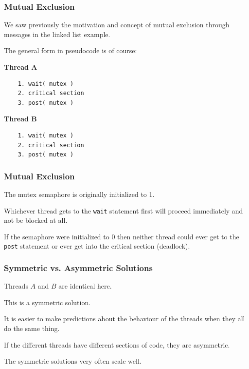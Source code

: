 \begin{frame}[fragile]
	\frametitle{Mutual Exclusion}

	We saw previously the motivation and concept of mutual exclusion through messages in the linked list example.

	The general form in pseudocode is of course:

	\begin{multicols}{2}
		\textbf{Thread A}
		\begin{verbatim}
	1. wait( mutex )
	2. critical section
	3. post( mutex )
  \end{verbatim}
		\columnbreak
		\textbf{Thread B}
		\begin{verbatim}
	1. wait( mutex )
	2. critical section
	3. post( mutex )
  \end{verbatim}
	\end{multicols}
	\vspace{-2em}


\end{frame}

\begin{frame}
	\frametitle{Mutual Exclusion}

	The mutex semaphore is originally initialized to 1.

	Whichever thread gets to the \texttt{wait} statement first will proceed immediately and not be blocked at all.

	If the semaphore were initialized to 0 then neither thread could ever get to the \texttt{post} statement or ever get into the critical section (deadlock).


\end{frame}

\begin{frame}
	\frametitle{Symmetric vs. Asymmetric Solutions}

	Threads $A$ and $B$ are identical here.

	This is a \alert{symmetric} solution.

	It is easier to make predictions about the behaviour of the threads when they all do the same thing.

	If the different threads have different sections of code, they are \alert{asymmetric}.

	The symmetric solutions very often scale well.


\end{frame}

